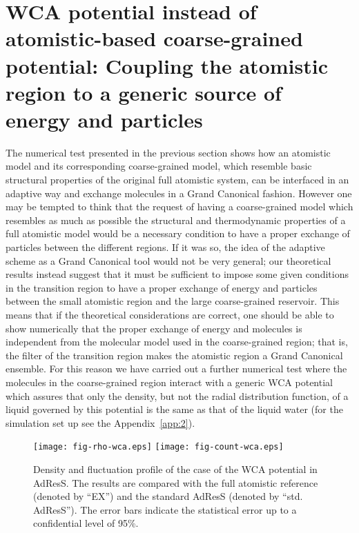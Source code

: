 \documentclass[aps,a4paper,reprint,onecolumn]{revtex4}
\begin{document}
\section{WCA potential instead of atomistic-based coarse-grained potential: Coupling the atomistic region to a generic source of energy and particles}
The numerical test presented in the previous section shows how an atomistic model and its corresponding coarse-grained model, which resemble basic structural properties of the original full atomistic system, can be interfaced in an adaptive way and exchange molecules in a Grand Canonical fashion. However one may be tempted to think that the request of having a coarse-grained model which resembles as much as possible the structural and thermodynamic properties of a full atomistic model would be a necessary condition to have a proper exchange of particles between the different regions. If it was so, the idea of the adaptive scheme as a Grand Canonical tool would not be very general; our theoretical results instead suggest that it must be sufficient to impose some given conditions in the transition region to have a proper exchange of energy and particles between the small atomistic region and the large coarse-grained reservoir. 
This means that if the theoretical considerations are correct, one should be able to show numerically that the proper exchange of energy and molecules is independent from the molecular model used in the coarse-grained region; that is, the filter of the transition region makes the atomistic region a Grand Canonical ensemble. For this reason we have carried out a further numerical test where the molecules in the coarse-grained region interact with a generic WCA potential which assures that only the density, but not the radial distribution function, of a liquid governed by this potential is the same as that of the liquid water (for the simulation set up see the Appendix~\ref{app:2}).
\begin{figure}
  \centering
  \texttt{[image: fig-rho-wca.eps]}
  \texttt{[image: fig-count-wca.eps]}
  \caption{Density and fluctuation profile of the case of the WCA potential in AdResS.  The
    results are compared with the full atomistic reference (denoted by
    ``EX'') and the  standard AdResS (denoted by ``std. AdResS'').
    The error bars indicate the statistical error up to a confidential
    level of 95\%.
  }
  \label{fig:wca-den}
\end{figure}
\end{document}
